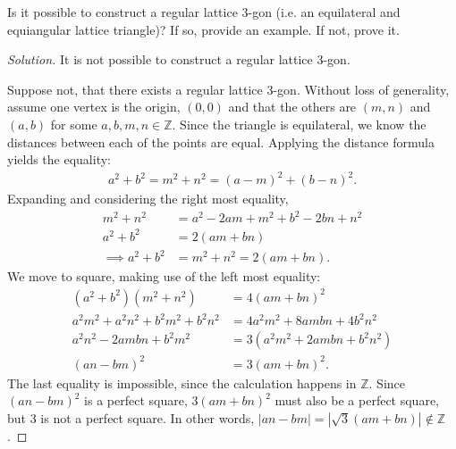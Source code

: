 \documentclass[12pt]{article}
\newcommand{\Z}{\mathbb{Z}}
\newenvironment{exercise}[2][Exercise]{\begin{trivlist}
        \item[\hskip \labelsep {\bfseries #1}\hskip \labelsep {\bfseries #2.}]}{\end{trivlist}}
\newenvironment{solution}
        {\begin{proof}[Solution]}
                    {\end{proof}}
\begin{document}
\begin{exercise}{1}
    Is it possible to construct a regular lattice 3-gon (i.e. an equilateral and equiangular lattice triangle)? If so, provide an example. If not, prove it.
    \begin{solution}
        It is not possible to construct a regular lattice 3-gon.

        Suppose not, that there exists a regular lattice 3-gon. Without loss of generality, assume one vertex is the origin, \( ( 0,0 ) \) and that the others are \( (m,n) \) and \( (a,b) \) for some \( a,b,m,n \in \Z \). Since the triangle is equilateral, we know the distances between each of the points are equal. Applying the distance formula yields the equality:
        \begin{align*}
            a^2+b^2 = m^{2} + n^{2} = (a-m)^{2} + ( b-n )^{2}.
        \end{align*}
        Expanding and considering the right most equality,
        \begin{align*}
            m^{2} + n^{2} &= a^{2} - 2am + m^{2} + b^{2} - 2bn + n^{2}\\
            a^{2} + b^{2}  &= 2 ( am + bn )\\
            \implies a^{2} + b^{2} &= m^{2} + n^{2} = 2(am + bn).
        \end{align*}
        We move to square, making use of the left most equality:
        \begin{align*}
            (a^{2} + b^{2} ) ( m^{2} + n^{2} ) &= 4 ( am + bn )^{2} \\
            a^{2} m^{2} + a^{2} n^{2} + b^{2} m^{2} + b^{2}n^{2} &= 4 a^{2} m^{2} + 8ambn + 4b^{2} n^{2} \\
            a^{2} n^{2} - 2ambn + b^{2} m^{2} &= 3(a^{2} m^{2} + 2ambn + b^{2} n^{2} ) \\
            (an-bm)^{2} &= 3(am+bn)^{2}.
        \end{align*}
        The last equality is impossible, since the calculation happens in \( \Z. \) Since \( (an-bm)^{2}  \) is a perfect square, \( 3 ( am+bn )^{2} \) must also be a perfect square, but 3 is not a perfect square. In other words, \( \left| an-bm \right| = \left| \sqrt{3} (am+bn) \right| \notin \Z \).
    \end{solution}
\end{exercise}
\end{document}
